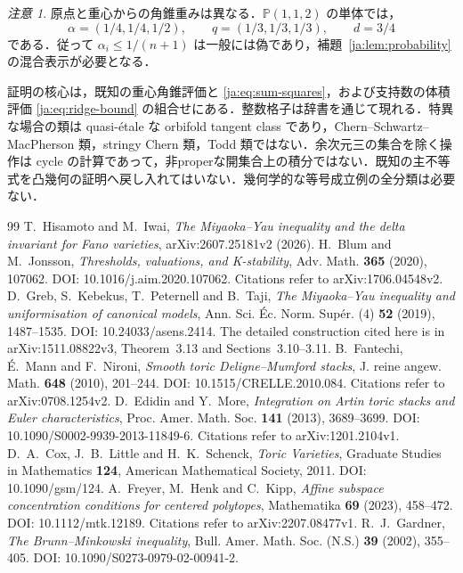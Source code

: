 \documentclass[12pt]{amsart}
\theoremstyle{definition}
\theoremstyle{remark}
\numberwithin{equation}{section}
\theoremstyle{plain}
\theoremstyle{definition}
\theoremstyle{remark}
\newtheorem{jrem}[thm]{注意}
\begin{document}
\begin{jrem}\label{ja:rem:scope}
原点と重心からの角錐重みは異なる．$\mathbb P(1,1,2)$ の単体では，
\[\alpha=(1/4,1/4,1/2),\qquad q=(1/3,1/3,1/3),\qquad d=3/4\]
である．従って $\alpha_i\le1/(n+1)$ は一般には偽であり，補題~\ref{ja:lem:probability} の混合表示が必要となる．

証明の核心は，既知の重心角錐評価と \eqref{ja:eq:sum-squares}，および支持数の体積評価 \eqref{ja:eq:ridge-bound} の組合せにある．整数格子は辞書を通じて現れる．特異な場合の類は quasi-\'{e}tale な orbifold tangent class であり，Chern--Schwartz--MacPherson 類，stringy Chern 類，Todd 類ではない．余次元三の集合を除く操作は cycle の計算であって，非properな開集合上の積分ではない．既知の主不等式を凸幾何の証明へ戻し入れてはいない．幾何学的な等号成立例の全分類は必要ない．
\end{jrem}
\begin{thebibliography}{99}
T.~Hisamoto and M.~Iwai,
\emph{The Miyaoka--Yau inequality and the delta invariant for Fano varieties},
arXiv:2607.25181v2 (2026).
H.~Blum and M.~Jonsson,
\emph{Thresholds, valuations, and K-stability},
Adv. Math. \textbf{365} (2020), 107062.
DOI: 10.1016/j.aim.2020.107062.
Citations refer to arXiv:1706.04548v2.
D.~Greb, S.~Kebekus, T.~Peternell and B.~Taji,
\emph{The Miyaoka--Yau inequality and uniformisation of canonical models},
Ann. Sci. \'Ec. Norm. Sup\'er. (4) \textbf{52} (2019), 1487--1535.
DOI: 10.24033/asens.2414.
The detailed construction cited here is in arXiv:1511.08822v3,
Theorem~3.13 and Sections~3.10--3.11.
B.~Fantechi, \'E.~Mann and F.~Nironi,
\emph{Smooth toric Deligne--Mumford stacks},
J. reine angew. Math. \textbf{648} (2010), 201--244.
DOI: 10.1515/CRELLE.2010.084.
Citations refer to arXiv:0708.1254v2.
D.~Edidin and Y.~More,
\emph{Integration on Artin toric stacks and Euler characteristics},
Proc. Amer. Math. Soc. \textbf{141} (2013), 3689--3699.
DOI: 10.1090/S0002-9939-2013-11849-6.
Citations refer to arXiv:1201.2104v1.
D.~A.~Cox, J.~B.~Little and H.~K.~Schenck,
\emph{Toric Varieties},
Graduate Studies in Mathematics \textbf{124},
American Mathematical Society, 2011.
DOI: 10.1090/gsm/124.
A.~Freyer, M.~Henk and C.~Kipp,
\emph{Affine subspace concentration conditions for centered polytopes},
Mathematika \textbf{69} (2023), 458--472.
DOI: 10.1112/mtk.12189.
Citations refer to arXiv:2207.08477v1.
R.~J.~Gardner,
\emph{The Brunn--Minkowski inequality},
Bull. Amer. Math. Soc. (N.S.) \textbf{39} (2002), 355--405.
DOI: 10.1090/S0273-0979-02-00941-2.
\end{thebibliography}
\end{document}
